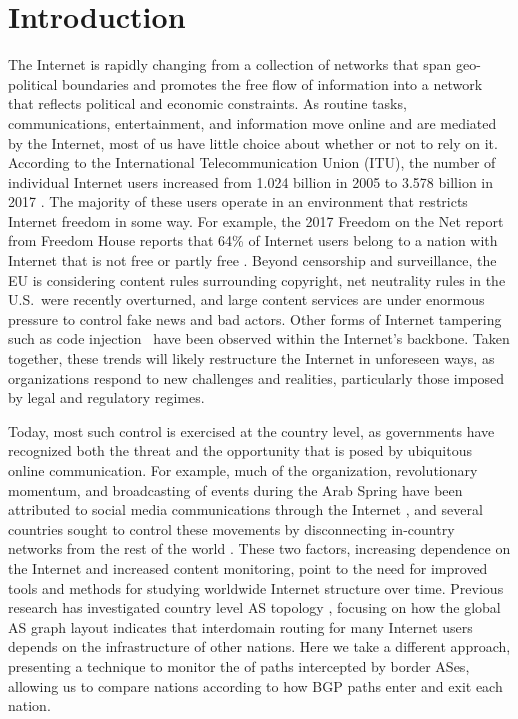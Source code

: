 \section{Introduction}

\par The Internet is rapidly changing from a collection of networks that span geo-political boundaries and promotes the free flow of information into a network that reflects political and economic constraints.
As routine
tasks, communications, entertainment, and information move online and
are mediated by the Internet, most of us have little choice about
whether or not to rely on it.  According to the
International Telecommunication Union (ITU), the number of individual
Internet users increased from 1.024 billion in 2005 to 3.578 billion
in 2017 \cite{itu}. The majority of these users operate in an
environment that restricts Internet freedom in some way. For example,
the 2017 Freedom on the Net report from Freedom House reports that
64\% of Internet users belong to a nation with Internet that is not
free or partly free \cite{FOTN}.  Beyond censorship and surveillance,
the EU is considering content rules surrounding copyright, net
neutrality rules in the U.S.\ were recently overturned, and large
content services are under enormous pressure to control fake news and bad actors. Other forms of Internet
tampering such as code injection~\cite{badtraffic,191996} have been observed within the
Internet's backbone. Taken together, these
trends will likely restructure the Internet in unforeseen ways,
as organizations respond to new challenges and realities, particularly those imposed by legal and regulatory regimes.

Today, most such control is exercised at the country level, as
governments have recognized both the threat and the opportunity that
is posed by ubiquitous online communication. For example, much of the
organization, revolutionary momentum, and broadcasting of events
during the Arab Spring have been attributed to social media
communications through the Internet \cite{arabspring}, and several
countries sought to control these movements by disconnecting
in-country networks from the rest of the world \cite{BGPdisrupt}.
These two factors, increasing dependence on the Internet and increased
content monitoring, point to the need for improved tools and methods
for studying worldwide Internet structure over time. Previous research has
investigated country level AS topology \cite{DBLP:journals/corr/abs-0903-3218},
focusing on how the global AS graph layout indicates that interdomain routing
for many Internet users depends on the infrastructure of other nations. Here we take
a different approach, presenting a technique to monitor the of paths intercepted
by border ASes, allowing us to compare nations according to how BGP paths enter and exit
each nation.

